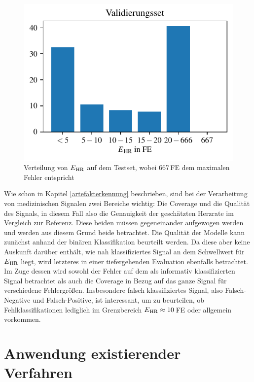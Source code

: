 \begin{figure}[H]
	\centering
	\includegraphics{pic/mlp-statistical-testset.pdf}
	\caption[Verteilung von $E\textsubscript{HR}$ auf dem Testset]{Verteilung von $E\textsubscript{HR}$ auf dem Testset, wobei 667\,\si{FE} dem maximalen Fehler entspricht}
	\label{fig:validation-set}
\end{figure}


Wie schon in Kapitel \ref{artefakterkennung} beschrieben, sind bei der Verarbeitung von medizinischen Signalen zwei Bereiche wichtig: Die Coverage und die Qualität des Signals, in diesem Fall also die Genauigkeit der geschätzten Herzrate im Vergleich zur Referenz. Diese beiden müssen gegeneinander aufgewogen werden und werden aus diesem Grund beide betrachtet. Die Qualität der Modelle kann zunächst anhand der binären Klassifikation beurteilt werden. Da diese aber keine Auskunft darüber enthält, wie nah klassifiziertes Signal an dem Schwellwert für $E\textsubscript{HR}$ liegt, wird letzteres in einer tiefergehenden Evaluation ebenfalls betrachtet. Im Zuge dessen wird sowohl der Fehler auf dem als informativ klassifizierten Signal betrachtet als auch die Coverage in Bezug auf das ganze Signal für verschiedene Fehlergrößen. Insbesondere falsch klassifiziertes Signal, also Falsch-Negative und Falsch-Positive, ist interessant, um zu beurteilen, ob Fehlklassifikationen lediglich im Grenzbereich $E\textsubscript{HR} \approx 10$\,\si{FE} oder allgemein vorkommen.

\section{Anwendung existierender Verfahren}

